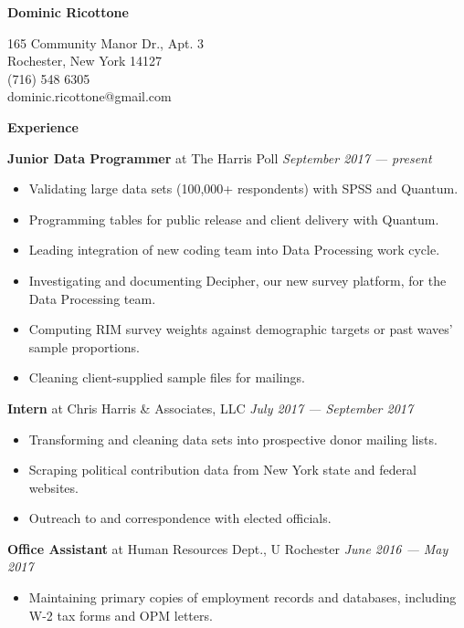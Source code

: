 \documentclass[12pt]{article}
\newenvironment{details}{
\begin{itemize}[label={}]
  \small \setlength{\itemsep}{0pt}
}{\end{itemize}}
\begin{document}
\centering \Huge
\textbf{Dominic Ricottone}

\footnotesize
\begin{multicols}{2}
165 Community Manor Dr., Apt. 3 \\
Rochester, New York 14127 \\
(716) 548 6305 \\
dominic.ricottone@gmail.com
\end{multicols}

\large
\textbf{Experience} \hrulefill

\vspace{.1in}
\normalsize
\textbf{Junior Data Programmer} at The Harris Poll \hfill \textit{September 2017 --- present}
\begin{details}
  \item Validating large data sets (100,000+ respondents) with SPSS and Quantum.
  \item Programming tables for public release and client delivery with Quantum.
  \item Leading integration of new coding team into Data Processing work cycle.
  \item Investigating and documenting Decipher, our new survey platform, for the Data Processing team.
  \item Computing RIM survey weights against demographic targets or past waves' sample proportions.
  \item Cleaning client-supplied sample files for mailings.
\end{details}

\vspace{.1in}
\normalsize
\textbf{Intern} at Chris Harris \& Associates, LLC \hfill \textit{July 2017 --- September 2017}
\begin{details}
	\item Transforming and cleaning data sets into prospective donor mailing lists.
	\item Scraping political contribution data from New York state and federal websites.
	\item Outreach to and correspondence with elected officials.
\end{details}

\vspace{.1in}
\normalsize
\textbf{Office Assistant} at Human Resources Dept., U Rochester  \hfill \textit{June 2016 --- May 2017}
\begin{details}
  \item Maintaining primary copies of employment records and databases, including W-2 tax forms and OPM letters.
\end{details}
\end{document}
